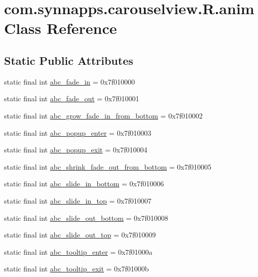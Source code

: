 \hypertarget{classcom_1_1synnapps_1_1carouselview_1_1_r_1_1anim}{}\section{com.\+synnapps.\+carouselview.\+R.\+anim Class Reference}
\label{classcom_1_1synnapps_1_1carouselview_1_1_r_1_1anim}
\subsection*{Static Public Attributes}
\begin{DoxyCompactItemize}
\item 
static final int \mbox{\hyperlink{classcom_1_1synnapps_1_1carouselview_1_1_r_1_1anim_a5bbdf51a26336e553745a3b69c5458f8}{abc\+\_\+fade\+\_\+in}} = 0x7f010000
\item 
static final int \mbox{\hyperlink{classcom_1_1synnapps_1_1carouselview_1_1_r_1_1anim_a12c91c2037d242524556949a9687d5e8}{abc\+\_\+fade\+\_\+out}} = 0x7f010001
\item 
static final int \mbox{\hyperlink{classcom_1_1synnapps_1_1carouselview_1_1_r_1_1anim_ad86f05c278d645e518a5ce96f3a4a9f8}{abc\+\_\+grow\+\_\+fade\+\_\+in\+\_\+from\+\_\+bottom}} = 0x7f010002
\item 
static final int \mbox{\hyperlink{classcom_1_1synnapps_1_1carouselview_1_1_r_1_1anim_afeba49cbee8fa54e542bcfef3e85b46c}{abc\+\_\+popup\+\_\+enter}} = 0x7f010003
\item 
static final int \mbox{\hyperlink{classcom_1_1synnapps_1_1carouselview_1_1_r_1_1anim_ad087b99dfa55190ac4ef66ba63ce9abb}{abc\+\_\+popup\+\_\+exit}} = 0x7f010004
\item 
static final int \mbox{\hyperlink{classcom_1_1synnapps_1_1carouselview_1_1_r_1_1anim_abde5de2bebb401924da3a13fa6e8c5ad}{abc\+\_\+shrink\+\_\+fade\+\_\+out\+\_\+from\+\_\+bottom}} = 0x7f010005
\item 
static final int \mbox{\hyperlink{classcom_1_1synnapps_1_1carouselview_1_1_r_1_1anim_abb2d4c4b3e1a21a9aa9b2613da909a76}{abc\+\_\+slide\+\_\+in\+\_\+bottom}} = 0x7f010006
\item 
static final int \mbox{\hyperlink{classcom_1_1synnapps_1_1carouselview_1_1_r_1_1anim_a3c6be34877ed54c4862f8a7e7bd80e50}{abc\+\_\+slide\+\_\+in\+\_\+top}} = 0x7f010007
\item 
static final int \mbox{\hyperlink{classcom_1_1synnapps_1_1carouselview_1_1_r_1_1anim_a2a67947fad856a48b0e44536066d8dcd}{abc\+\_\+slide\+\_\+out\+\_\+bottom}} = 0x7f010008
\item 
static final int \mbox{\hyperlink{classcom_1_1synnapps_1_1carouselview_1_1_r_1_1anim_a8e4b33bac516d1e4627aa88da8f70a30}{abc\+\_\+slide\+\_\+out\+\_\+top}} = 0x7f010009
\item 
static final int \mbox{\hyperlink{classcom_1_1synnapps_1_1carouselview_1_1_r_1_1anim_aa4db6b5526a3505b09109ef736a16e9b}{abc\+\_\+tooltip\+\_\+enter}} = 0x7f01000a
\item 
static final int \mbox{\hyperlink{classcom_1_1synnapps_1_1carouselview_1_1_r_1_1anim_a7a33a5e2bc46edc4c3a9b3824929ea03}{abc\+\_\+tooltip\+\_\+exit}} = 0x7f01000b
\end{DoxyCompactItemize}
